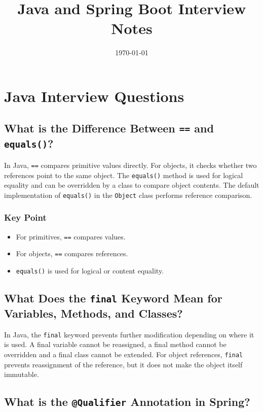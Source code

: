 \documentclass[12pt,a4paper]{article}
\title{Java and Spring Boot Interview Notes}
\author{}
\date{\today}
\begin{document}
\maketitle

\section{Java Interview Questions}

\subsection{What is the Difference Between \texttt{==} and \texttt{equals()}?}

In Java, \texttt{==} compares primitive values directly. For objects, it
checks whether two references point to the same object. The
\texttt{equals()} method is used for logical equality and can be overridden
by a class to compare object contents. The default implementation of
\texttt{equals()} in the \texttt{Object} class performs reference
comparison.

\subsubsection*{Key Point}

\begin{itemize}
    \item For primitives, \texttt{==} compares values.
    \item For objects, \texttt{==} compares references.
    \item \texttt{equals()} is used for logical or content equality.
\end{itemize}

\subsection{What Does the \texttt{final} Keyword Mean for Variables, Methods, and Classes?}

In Java, the \texttt{final} keyword prevents further modification depending
on where it is used. A final variable cannot be reassigned, a final method
cannot be overridden and a final class cannot be extended. For object
references, \texttt{final} prevents reassignment of the reference, but it
does not make the object itself immutable.

\subsection{What is the \texttt{@Qualifier} Annotation in Spring?}
\end{document}

